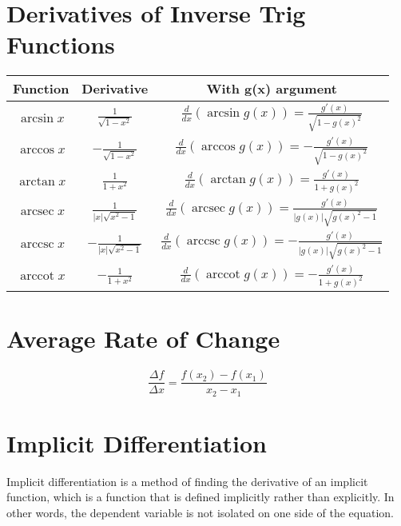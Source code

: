 \section{Derivatives of Inverse Trig Functions}
\begin{center}
  \begin{tabular}{|c|c|c|}
    \hline
    \textbf{Function} & \textbf{Derivative} & \textbf{With g(x) argument} \\
    \hline
    $\arcsin{x}$ & $\frac{1}{\sqrt{1-x^2}}$ & $\frac{d}{dx}(\arcsin{g(x)}) = 
    \frac{g'(x)}{\sqrt{1-g(x)^2}}$ \\
    \hline
    $\arccos{x}$ & $-\frac{1}{\sqrt{1-x^2}}$ & $\frac{d}{dx}(\arccos{g(x)}) = 
    -\frac{g'(x)}{\sqrt{1-g(x)^2}}$ \\
    \hline
    $\arctan{x}$ & $\frac{1}{1+x^2}$ & $\frac{d}{dx}(\arctan{g(x)}) = 
    \frac{g'(x)}{1+g(x)^2}$ \\
    \hline
    $\operatorname{arcsec}{x}$ & $\frac{1}{|x|\sqrt{x^2-1}}$ & 
    $\frac{d}{dx}(\operatorname{arcsec}{g(x)}) = 
    \frac{g'(x)}{|g(x)|\sqrt{g(x)^2-1}}$ \\
    \hline
    $\operatorname{arccsc}{x}$ & $-\frac{1}{|x|\sqrt{x^2-1}}$ & 
    $\frac{d}{dx}(\operatorname{arccsc}{g(x)}) = 
    -\frac{g'(x)}{|g(x)|\sqrt{g(x)^2-1}}$ \\
    \hline
    $\operatorname{arccot}{x}$ & $-\frac{1}{1+x^2}$ & 
    $\frac{d}{dx}(\operatorname{arccot}{g(x)}) = -\frac{g'(x)}{1+g(x)^2}$ \\
    \hline
    \end{tabular}
\end{center}


\section{Average Rate of Change}
\begin{equation*}
  \frac{\Delta f}{\Delta x} = \frac{f(x_2)-f(x_1)}{x_2-x_1}
\end{equation*}


\section{Implicit Differentiation}

Implicit differentiation is a method of finding the derivative of an implicit 
function, which is a function that is defined implicitly rather than explicitly. 
In other words, the dependent variable is not isolated on one side of the 
equation. 

